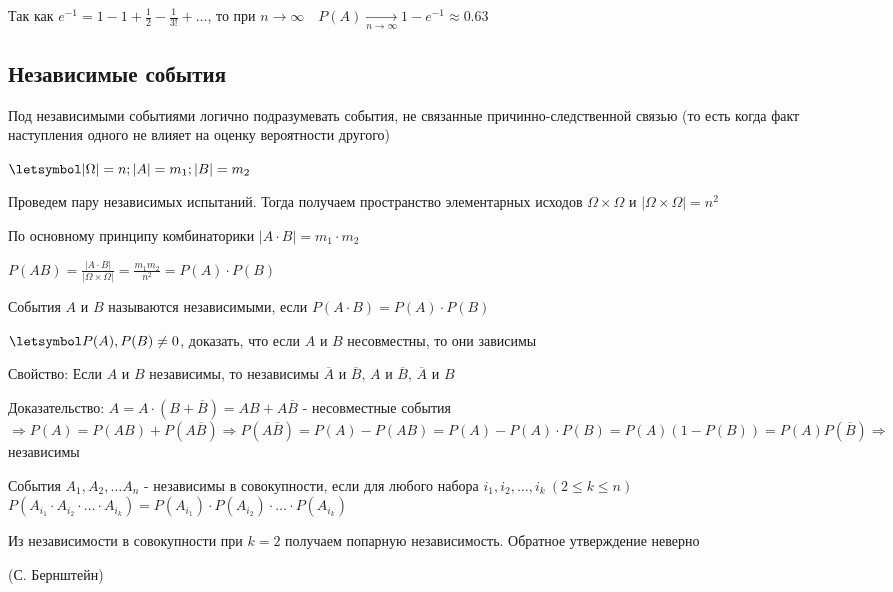\documentclass[12pt]{article}
\begin{document}
    Так как $e^{-1} = 1 - 1 + \frac{1}{2} - \frac{1}{3!} + \dots$, то при $n \to \infty \quad P(A) \underset{n \to \infty}{\to} 1 - e^{-1} \approx 0.63$

    \subsection{Независимые события}

    Под независимыми событиями логично подразумевать события, не связанные причинно-следственной связью (то есть когда факт наступления одного не влияет на оценку вероятности другого)

    $\letsymbol |\Omega| = n; |A| = m_1; |B| = m_2$

    Проведем пару независимых испытаний. Тогда получаем пространство элементарных исходов $\Omega \times \Omega$ и $|\Omega \times \Omega| = n^2$

    По основному принципу комбинаторики $|A \cdot B| = m_1 \cdot m_2$

    $P(AB) = \frac{|A \cdot B|}{|\Omega \times \Omega|} = \frac{m_1 m_2}{n^2} = P(A) \cdot P(B)$

    \hypertarget{independantevents}{}

    \Def События $A$ и $B$ называются независимыми, если $P(A \cdot B) = P(A) \cdot P(B)$

    \Lab $\letsymbol P(A), P(B) \neq 0$, доказать, что если $A$ и $B$ несовместны, то они зависимы

    Свойство: Если $A$ и $B$ независимы, то независимы $\overline{A}$ и $\overline{B}$, $A$ и $\overline{B}$, $\overline{A}$ и $B$

    Доказательство: $A = A \cdot (B + \overline{B}) = AB + A\overline{B}$ - несовместные события $\Longrightarrow P(A) = P(AB) + P(A\overline{B}) \Longrightarrow P(A\overline{B}) = P(A) - P(AB) =
    P(A) - P(A) \cdot P(B) = P(A) (1 - P(B)) = P(A) P(\overline{B}) \Longrightarrow$ независимы

    \Def События $A_1, A_2, \dots A_n$ - независимы в совокупности, если для любого набора $i_1, i_2, \dots, i_k \ (2 \leq k \leq n)$
    $P(A_{i_1} \cdot A_{i_2} \cdot \dots \cdot A_{i_k}) = P(A_{i_1}) \cdot P(A_{i_2}) \cdot \dots \cdot P(A_{i_k})$

    \Nota Из независимости в совокупности при $k = 2$ получаем попарную независимость. Обратное утверждение неверно

    \hypertarget{bernshteinsexample}{}

    \Ex (С. Бернштейн)
\end{document}
